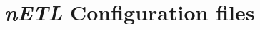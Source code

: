 \section{\textit{nETL} Configuration files}

\label{netl-run1-config}
\begin{verbatim}
\end{verbatim}

\label{netl-run2-config}
\begin{verbatim}
\end{verbatim}

\label{netl-run3-config}
\begin{verbatim}
\end{verbatim}